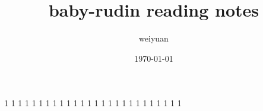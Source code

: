 
\title{baby-rudin reading notes}
\author{weiyuan}
\date{\today}


    \frontmatter
    \maketitle
    \tableofcontents
    \mainmatter
    
    
    
    
    
    
    
    
    
    
    
    
    
    1\cite{ARTIN1964}
    1\cite{BOAS1960}
    1\cite{BUCK1962}
    1\cite{unknown1965AdvancedCalculus}
    1\cite{BURKILL1951}
    1\cite{DIEUDONNE1960}
    1\cite{FLEMING1965}
    1\cite{GRAVES1956}
    1\cite{HALMOS1950}
    1\cite{unknown1958Finite}
    1\cite{HARDY1947}
    1\cite{ROGOSINSKI1950}
    1\cite{HERSTEIN1964}
    1\cite{HEWITT1965}
    1\cite{KELLOGG1940}
    1\cite{KNOPP1928}
    1\cite{LANDAU1951}
    1\cite{MCSHANE1944}
    1\cite{NIVEN1956}
    1\cite{ROYDEN1963}
    1\cite{RUDIN1974_bigrudin}
    1\cite{SIMMONS1963}
    1\cite{SINGER1967}
    1\cite{SMITH1971}
    1\cite{SPIVAK1965}
    1\cite{THURSTON1956}

    
    
